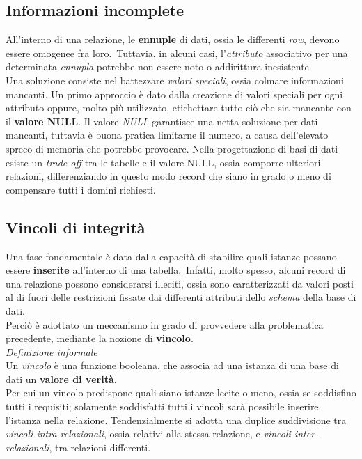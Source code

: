 \documentclass{article}
\begin{document}
\subsection*{Informazioni incomplete}
\large
All'interno di una relazione, le \textbf{ennuple} di dati, ossia le differenti \textit{row}, devono essere omogenee fra loro.\ Tuttavia, in alcuni casi, l'\textit{attributo} associativo per una determinata \textit{ennupla} potrebbe non essere noto o addirittura inesistente.\vspace{14pt}\\
Una soluzione consiste nel battezzare \textit{valori speciali}, ossia colmare informazioni mancanti. Un primo approccio è dato dalla creazione di valori speciali per ogni attributo oppure, molto più utilizzato, etichettare tutto ciò che sia mancante con il \textbf{valore NULL}.
Il valore \textit{NULL} garantisce una netta soluzione per dati mancanti, tuttavia è buona pratica limitarne il numero, a causa dell'elevato spreco di memoria che potrebbe provocare. Nella progettazione di basi di dati esiste un \textit{trade-off} tra le tabelle e il valore NULL, ossia comporre ulteriori relazioni, differenziando in questo modo record che siano in grado o meno di compensare tutti i domini richiesti.

\subsection*{Vincoli di integrità}
\large
Una fase fondamentale è data dalla capacità di stabilire quali istanze possano essere \textbf{inserite} all'interno di una tabella.\ Infatti, molto spesso, alcuni record di una relazione possono considerarsi illeciti, ossia sono caratterizzati da valori posti al di fuori delle restrizioni fissate dai differenti attributi dello \textit{schema} della base di dati.\vspace{14pt}\\
Perciò è adottato un meccanismo in grado di provvedere alla problematica precedente, mediante la nozione di \textbf{vincolo}.\vspace{14pt}\\ 
\textit{Definizione informale}\\Un \textit{vincolo} è una funzione booleana, che associa ad una istanza di una base di dati un \textbf{valore di verità}.\vspace{14pt}\\
Per cui un vincolo predispone quali siano istanze lecite o meno, ossia se soddisfino tutti i requisiti; solamente soddisfatti tutti i vincoli sarà possibile inserire l'istanza nella relazione. Tendenzialmente si adotta una duplice suddivisione tra \textit{vincoli intra-relazionali}, ossia relativi alla stessa relazione, e \textit{vincoli inter-relazionali}, tra relazioni differenti.
\end{document}
